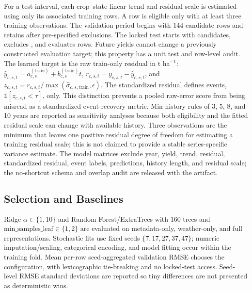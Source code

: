 \documentclass[conference]{IEEEtran}
\begin{document}
For a test interval, each crop--state linear trend and residual scale is estimated
using only its associated training rows. A row is eligible only with at least three
training observations. The validation period begins with 144 candidate rows and
retains \AuditValidationRows{} after \AuditValidationExcluded{} pre-specified
exclusions. The locked test starts with \AuditTestCandidateRows{} candidates,
excludes \AuditTestExcluded{}, and evaluates \AuditTestRows{} rows. Future yields
cannot change a previously
constructed evaluation target; this property has a unit test and row-level audit.
The learned target is the raw train-only residual in t ha$^{-1}$:
$\hat{y}_{c,s,t}=a^{(\mathrm{train})}_{c,s}+b^{(\mathrm{train})}_{c,s}t$,
$r_{c,s,t}=y_{c,s,t}-\hat{y}_{c,s,t}$, and
$z_{c,s,t}=r_{c,s,t}/\max(\hat{\sigma}_{c,s,\mathrm{train}},\epsilon)$.
The standardized residual defines events, $\mathbb{1}[z_{c,s,t}<\tau]$, only.
This distinction prevents a pooled raw-error score from being misread as a
standardized event-recovery metric. Min-history rules of 3, 5, 8, and 10 years are
reported as sensitivity analyses because both eligibility and the fitted residual
scale can change with available history. Three observations are the minimum that
leaves one positive residual degree of freedom for estimating a training residual
scale; this is not claimed to provide a stable series-specific variance estimate.
The model matrices exclude year, yield, trend, residual, standardized residual,
event labels, predictions, history length, and residual scale; the no-shortcut
schema and overlap audit are released with the artifact.

\subsection{Selection and Baselines}
Ridge $\alpha\in\{1,10\}$ and Random Forest/ExtraTrees with 160 trees and
$\mathrm{min\_samples\_leaf}\in\{1,2\}$ are evaluated on metadata-only,
weather-only, and full representations. Stochastic fits use fixed seeds
$\{7,17,27,37,47\}$; numeric imputation/scaling, categorical encoding, and model
fitting occur within the training fold. Mean per-row seed-aggregated validation
RMSE chooses the configuration, with lexicographic tie-breaking and no locked-test
access. Seed-level RMSE standard deviations are reported so tiny differences are
not presented as deterministic wins.
\end{document}
